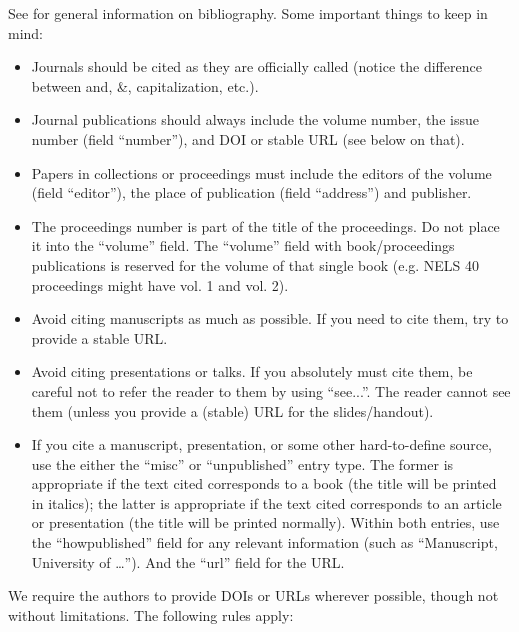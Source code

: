 See \citet{Nordhoff.Muller2020} for general information on bibliography. Some important things to keep in mind:

\begin{itemize}
    \item Journals should be cited as they are officially called (notice the difference between and, \&, capitalization, etc.).
    \item Journal publications should always include the volume number, the issue number (field ``number''), and DOI or stable URL (see below on that).
    \item Papers in collections or proceedings must include the editors of the volume (field ``editor''), the place of publication (field ``address'') and publisher.
    \item The proceedings number is part of the title of the proceedings. Do not place it into the ``volume'' field. The ``volume'' field with book/proceedings publications is reserved for the volume of that single book (e.g. NELS 40 proceedings might have vol. 1 and vol. 2).
    \item Avoid citing manuscripts as much as possible. If you need to cite them, try to provide a stable URL.
    \item Avoid citing presentations or talks. If you absolutely must cite them, be careful not to refer the reader to them by using ``see...''. The reader cannot see them (unless you provide a (stable) URL for the slides/handout).
    \item If you cite a manuscript, presentation, or some other hard-to-define source, use the either the ``misc'' or ``unpublished'' entry type. The former is appropriate if the text cited corresponds to a book (the title will be printed in italics); the latter is appropriate if the text cited corresponds to an article or presentation (the title will be printed normally). Within both entries, use the ``howpublished'' field for any relevant information (such as ``Manuscript, University of \dots''). And the ``url'' field for the URL.
\end{itemize}

\noindent We require the authors to provide DOIs or URLs wherever possible, though not without limitations. The following rules apply:

